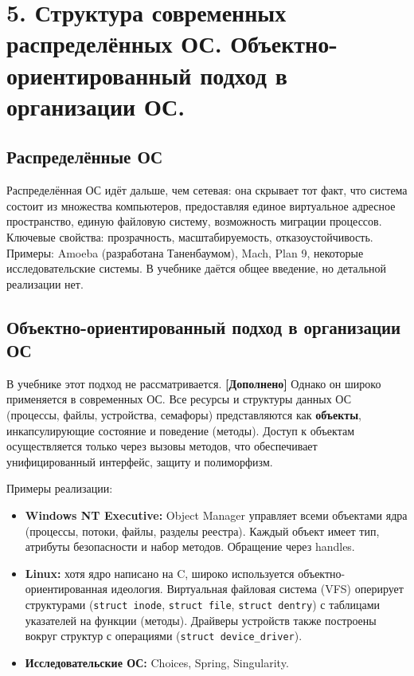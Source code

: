 \documentclass[a4paper,12pt]{article}
\begin{document}
\section*{5. Структура современных распределённых ОС. Объектно-ориентированный подход в организации ОС.}

\subsection{Распределённые ОС}
Распределённая ОС идёт дальше, чем сетевая: она скрывает тот факт, что система состоит из множества компьютеров, предоставляя единое виртуальное адресное пространство, единую файловую систему, возможность миграции процессов. Ключевые свойства: прозрачность, масштабируемость, отказоустойчивость. Примеры: Amoeba (разработана Таненбаумом), Mach, Plan 9, некоторые исследовательские системы. В учебнике даётся общее введение, но детальной реализации нет.

\subsection{Объектно-ориентированный подход в организации ОС}
В учебнике этот подход не рассматривается. \textbf{[Дополнено]} Однако он широко применяется в современных ОС. Все ресурсы и структуры данных ОС (процессы, файлы, устройства, семафоры) представляются как \textbf{объекты}, инкапсулирующие состояние и поведение (методы). Доступ к объектам осуществляется только через вызовы методов, что обеспечивает унифицированный интерфейс, защиту и полиморфизм.

Примеры реализации:
\begin{itemize}
    \item \textbf{Windows NT Executive:} Object Manager управляет всеми объектами ядра (процессы, потоки, файлы, разделы реестра). Каждый объект имеет тип, атрибуты безопасности и набор методов. Обращение через handles.
    \item \textbf{Linux:} хотя ядро написано на C, широко используется объектно-ориентированная идеология. Виртуальная файловая система (VFS) оперирует структурами (\texttt{struct inode}, \texttt{struct file}, \texttt{struct dentry}) с таблицами указателей на функции (методы). Драйверы устройств также построены вокруг структур с операциями (\texttt{struct device\_driver}).
    \item \textbf{Исследовательские ОС:} Choices, Spring, Singularity.
\end{itemize}
\end{document}
